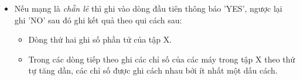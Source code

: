 \begin{itemize}
	\item     Nếu mạng là    \emph{     chẵn lẻ    }    thì ghi vào dòng đầu tiên thông báo 'YES', ngược lại ghi 'NO' sau đó ghi kết quả theo qui cách sau:    
\begin{itemize}
	\item       Dòng thứ hai ghi số phần tử của tập X.     
	\item       Trong các dòng tiếp theo ghi các chỉ số của các máy trong tập X theo thứ tự tăng dần, các chỉ số được ghi cách nhau bởi ít nhất một dấu cách.     
\end{itemize}
\end{itemize}